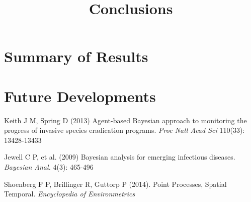 \documentclass[11pt,a4paper]{article}
\title{Conclusions}
\begin{document}
 \maketitle

\section{Summary of Results}

\section{Future Developments}



\begin{thebibliography}{99}


 Keith J M, Spring D (2013) Agent-based Bayesian approach to monitoring the progress of invasive species eradication programs. \textit{Proc Natl Acad Sci} 110(33): 13428-13433

 Jewell C P, et al. (2009) Bayesian analysis for emerging infectious diseases. \textit{Bayesian Anal.} 4(3): 465-496

 Shoenberg F P, Brillinger R, Guttorp P (2014). Point Processes, Spatial Temporal. \textit{Encyclopedia of Environmetrics}

\end{thebibliography}
\end{document}
